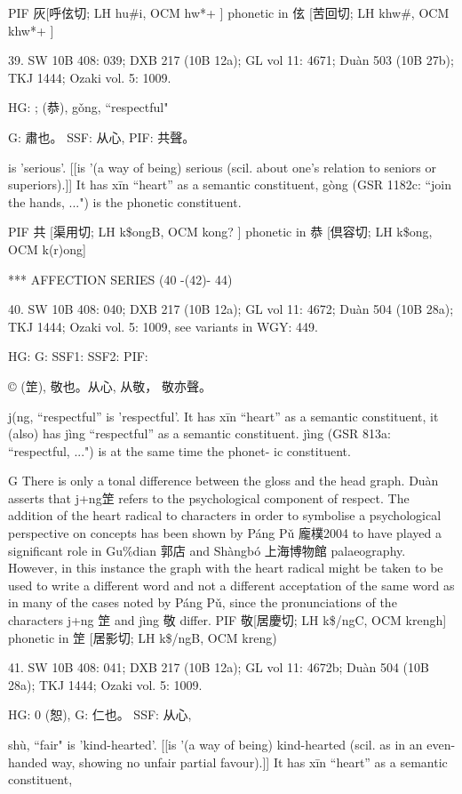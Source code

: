 PIF     灰[呼伭切; LH hu\#i, OCM hw*+ ] phonetic in 伭 [苦回切; LH khw\#, OCM khw*+ ]

39. SW 10B 408: 039; DXB 217 (10B 12a); GL vol 11: 4671; Duàn 503 (10B 27b); TKJ 1444; Ozaki vol. 5: 1009.

HG: ; (恭), gǒng, ``respectful"

G:	肅也。
SSF: 从心,
PIF: 共聲。

is 'serious'. [[is '(a way of being) serious (scil. about one's relation to seniors or superiors).]]
It has xīn ``heart'' as a semantic constituent,
gòng (GSR 1182c: ``join the hands, ...") is the phonetic constituent.

PIF     共 [渠用切; LH k\$ongB, OCM kong? ] phonetic in 恭 [倶容切; LH k\$ong, OCM k(r)ong]

***
AFFECTION SERIES (40 -(42)- 44)

40. SW 10B 408: 040; DXB 217 (10B 12a); GL vol 11: 4672; Duàn 504 (10B 28a); TKJ 1444; Ozaki vol. 5: 1009, see
variants in WGY: 449.


HG:
G: SSF1: SSF2: PIF:

© (䇥), 敬也。从心,
从敬， 敬亦聲。


j(ng, ``respectful'' is 'respectful'.
It has xīn ``heart'' as a semantic constituent,
it (also) has jìng ``respectful'' as a semantic constituent.
jìng (GSR 813a: ``respectful, ...") is at the same time the phonet- ic constituent.

G      There is only a tonal difference between the gloss and the head graph. Duàn asserts that j+ng䇥 refers to the psychological component of respect. The addition of the heart radical to characters in order to symbolise a psychological perspective on concepts has been shown by Páng Pǔ 龐樸2004 to have played a significant role in Gu\%dian 郭店 and Shàngbó 上海博物館 palaeography. However, in this instance the graph with the heart radical might be taken to be used to write a different word and not a different acceptation of the same word as in many of the cases noted by Páng Pǔ, since the pronunciations of the characters j+ng 䇥 and jìng 敬 differ.
PIF    敬[居慶切; LH k\$/ngC, OCM krengh] phonetic in 䇥 [居影切; LH k\$/ngB, OCM kreng)



41. SW 10B 408: 041; DXB 217 (10B 12a); GL vol 11: 4672b; Duàn 504 (10B 28a); TKJ 1444; Ozaki vol. 5: 1009.

HG: 0 (恕),
G:	仁也。
SSF: 从心,


shù, ``fair"
is 'kind-hearted'. [[is '(a way of being) kind-hearted (scil. as in an even-handed way, showing no unfair partial favour).]]
It has xīn ``heart'' as a semantic constituent,

